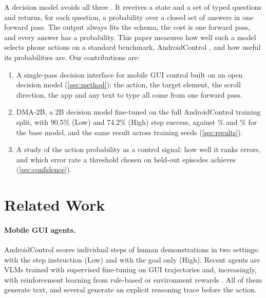 \documentclass{article}
\newcommand{\ours}{DMA-2B}
\begin{document}
A decision model avoids all three \citep{typesafe2026,liquidd12026}. It receives a state and a set of typed
questions and returns, for each question, a probability over a closed set of answers in one forward pass. The
output always fits the schema, the cost is one forward pass, and every answer has a probability. This paper
measures how well such a model selects phone actions on a standard benchmark, AndroidControl
\citep{androidcontrol2024}, and how useful its probabilities are. Our contributions are:
\begin{enumerate}
  \item A single-pass decision interface for mobile GUI control built on an open decision model
        (\cref{sec:method}): the action, the target element, the scroll direction, the app and any text to type
        all come from one forward pass.
  \item \ours{}, a 2B decision model fine-tuned on the full AndroidControl training split, with 90.5\% (Low) and
        74.2\% (High) step success, against \BASELOW\% and \BASEHIGH\% for the base model, and the same result
        across training seeds (\cref{sec:results}).
  \item A study of the action probability as a control signal: how well it ranks errors, and which error rate a
        threshold chosen on held-out episodes achieves (\cref{sec:confidence}).
\end{enumerate}

\section{Related Work}
\label{sec:related}

\paragraph{Mobile GUI agents.}
AndroidControl \citep{androidcontrol2024} scores individual steps of human demonstrations in two settings: with
the step instruction (Low) and with the goal only (High). Recent agents are VLMs trained with supervised
fine-tuning on GUI trajectories \citep{osatlas,aguvis,uitars2025} and, increasingly, with reinforcement learning
from rule-based or environment rewards \citep{uir1,guir1,infiguir1,uigenie,mobilerl2025}. All of them generate
text, and several generate an explicit reasoning trace before the action.
\end{document}
